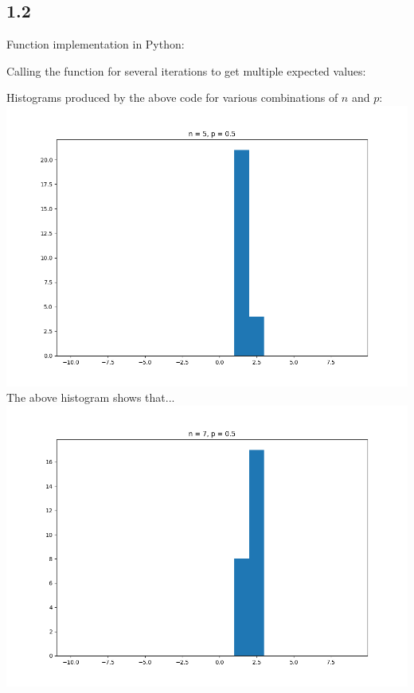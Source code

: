 \documentclass[answers]{exam}
\begin{document}
\subsection*{1.2}
Function implementation in Python:

Calling the function for several iterations to get multiple expected values:

\pagebreak
Histograms produced by the above code for various combinations of $n$ and $p$:\\
\includegraphics[scale = 0.7]{Q1_histograms/Q1.2 n = 5, p = 0.5.png}\\
The above histogram shows that...\\
\includegraphics[scale = 0.7]{Q1_histograms/Q1.2 n = 7, p = 0.5.png}\\
\end{document}
